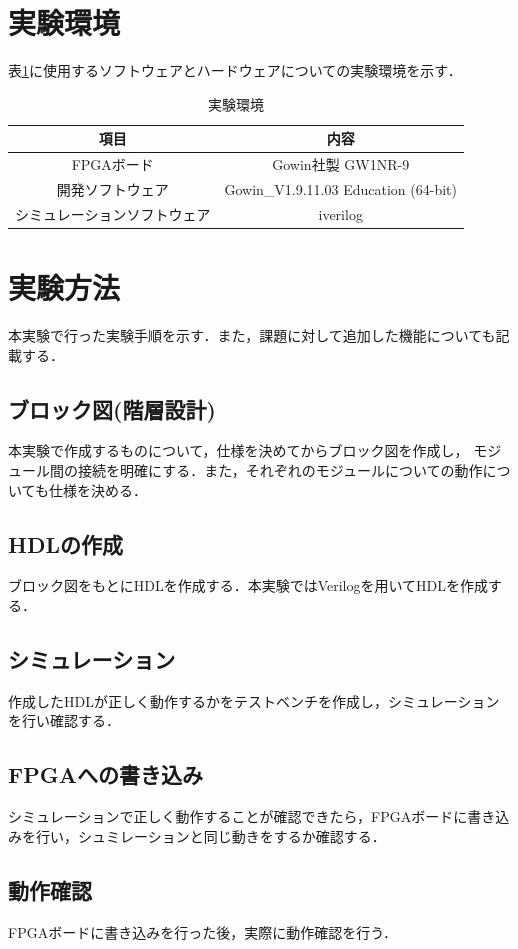 \documentclass[a4paper,11pt]{ltjsarticle}
\begin{document}
\section{実験環境}
表\ref{tab:zikken}に使用するソフトウェアとハードウェアについての実験環境を示す．
\begin{table}[H]
    \centering
    \caption{実験環境}
    \label{tab:zikken}
    \begin{tabular}{|c|c|}
        \hline
        項目             & 内容                                   \\
        \hline
        FPGAボード        & Gowin社製 GW1NR-9                      \\
        \hline
        開発ソフトウェア       & Gowin\_V1.9.11.03 Education (64-bit) \\
        \hline
        シミュレーションソフトウェア & iverilog                             \\
        \hline
    \end{tabular}
\end{table}
\section{実験方法}
本実験で行った実験手順を示す．また，課題に対して追加した機能についても記載する．
\subsection{ブロック図(階層設計)}
本実験で作成するものについて，仕様を決めてからブロック図を作成し，
モジュール間の接続を明確にする．また，それぞれのモジュールについての動作についても仕様を決める．
\subsection{HDLの作成}
ブロック図をもとにHDLを作成する．本実験ではVerilogを用いてHDLを作成する．
\subsection{シミュレーション}
作成したHDLが正しく動作するかをテストベンチを作成し，シミュレーションを行い確認する．
\subsection{FPGAへの書き込み}
シミュレーションで正しく動作することが確認できたら，FPGAボードに書き込みを行い，シュミレーションと同じ動きをするか確認する．
\subsection{動作確認}
FPGAボードに書き込みを行った後，実際に動作確認を行う．
\end{document}
